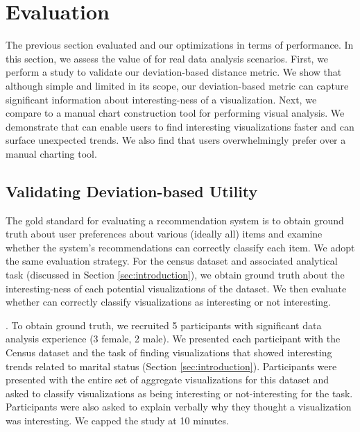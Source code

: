 
\section{Evaluation}
\label{sec:user_study}

The previous section evaluated \SeeDB and our optimizations in terms of 
performance.
In this section, we assess the value of \SeeDB for real data analysis 
scenarios.
First, we perform a study to validate our deviation-based distance metric.
We show that although simple and limited in its scope, our deviation-based
metric can capture significant information about interesting-ness
of a visualization.
Next, we compare \SeeDB to a manual chart construction tool for performing
visual analysis.
We demonstrate that \SeeDB can enable users to find interesting visualizations
faster and can surface unexpected trends.
We also find that users overwhelmingly prefer \SeeDB over a manual charting 
tool.

\subsection{Validating Deviation-based Utility}
\label{sec:validating_metric}
The gold standard for evaluating a recommendation system is to obtain ground 
truth about user preferences about
various (ideally all) items and examine whether the system's recommendations 
can correctly classify each item\cite{??}.
We adopt the same evaluation strategy.
For the census dataset and associated analytical task (discussed in Section 
\ref{sec:introduction}), we obtain ground truth about the interesting-ness of 
each potential visualizations of the dataset.
We then evaluate whether \SeeDB can correctly classify visualizations as
interesting or not interesting.

.
To obtain ground truth, we recruited 5 participants with significant data analysis 
experience (3 female, 2 male).
We presented each participant with the Census dataset and the task of finding visualizations
that showed interesting trends related to marital status (Section \ref{sec:introduction}).
Participants were presented with the entire set of aggregate visualizations 
for this dataset and asked to classify visualizations as being interesting or 
not-interesting for the task.
Participants were also asked to explain verbally why they thought a visualization
was interesting.
We capped the study at 10 minutes.


